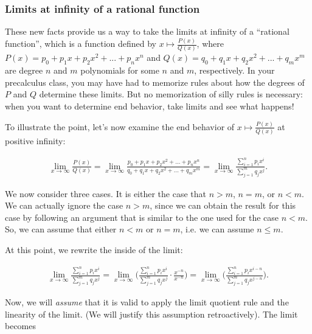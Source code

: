 \subsubsection*{Limits at infinity of a rational function}

These new facts provide us a way to take the limits at infinity of a ``rational function'', which is a function defined by $x \mapsto \frac{P(x)}{Q(x)}$, where $P(x) = p_0 + p_1 x + p_2 x^2 + ... + p_n x^n$ and $Q(x) = q_0 + q_1 x + q_2 x^2 + ... + q_m x^m$ are degree $n$ and $m$ polynomials for some $n$ and $m$, respectively. In your precalculus class, you may have had to memorize rules about how the degrees of $P$ and $Q$ determine these limits. But no memorization of silly rules is necessary: when you want to determine end behavior, take limits and see what happens!

To illustrate the point, let's now examine the end behavior of $x \mapsto \frac{P(x)}{Q(x)}$ at positive infinity:

\begin{align*}
    \lim_{x \rightarrow \infty} \frac{P(x)}{Q(x)} 
    = \lim_{x \rightarrow \infty} \frac{p_0 + p_1 x + p_2 x^2 + ... + p_n x^n}{q_0 + q_1 x + q_2 x^2 + ... + q_m x^m} 
    = \lim_{x \rightarrow \infty} \frac{\sum_{i = 1}^n p_i x^i}{\sum_{j = 1}^m q_j x^j}.
\end{align*}

We now consider three cases. It is either the case that $n > m$, $n = m$, or $n < m$. We can actually ignore the case $n > m$, since we can obtain the result for this case by following an argument that is similar to the one used for the case $n < m$. So, we can assume that either $n < m$ or $n = m$, i.e. we can assume $n \leq m$.

At this point, we rewrite the inside of the limit:

\begin{align*}
    \lim_{x \rightarrow \infty} \frac{\sum_{i = 1}^n p_i x^i}{\sum_{j = 1}^m q_j x^j} 
    = \lim_{x \rightarrow \infty} \Big( \frac{\sum_{i = 1}^n p_i x^i}{\sum_{j = 1}^m q_j x^j} \cdot \frac{x^{-n}}{x^{-n}} \Big)
    = \lim_{x \rightarrow \infty} \Big( \frac{\sum_{i = 1}^n p_i x^{i - n}}{\sum_{j = 1}^m q_j x^{j - n}} \Big).
\end{align*}

Now, we will \textit{assume} that it is valid to apply the limit quotient rule and the linearity of the limit. (We will justify this assumption retroactively). The limit becomes


